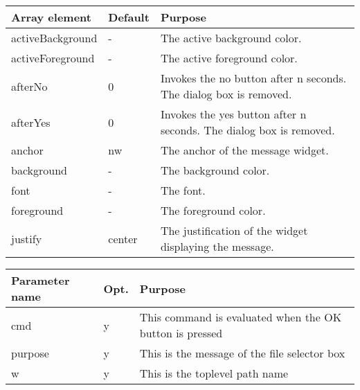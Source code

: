 {\newpage
\clearpage
\samepage \begin{tabular}{|l|l|p{5.5cm}|} \hline
Array element    & Default & Purpose \\  \hline
activeBackground & -       & The active background
                             color.\\  \hline
activeForeground & -       & The active foreground
                             color.\\  \hline
afterNo          & 0       & Invokes the no button after
                             n seconds. The dialog box
                             is removed.\\  \hline
afterYes         & 0       & Invokes the yes button after
                             n seconds. The dialog box
                             is removed.\\  \hline
anchor           & nw      & The anchor of the message
                             widget.\\  \hline
background       & -       & The background color.\\  \hline
font             & -       & The font.\\  \hline
foreground       & -       & The foreground color.\\  \hline
justify          & center  & The justification of the
                             widget displaying the
                             message.\\  \hline
\end{tabular}
}

{\newpage
\clearpage
\samepage \begin{figure}[ht]
  \centerline{
  \epsfysize=4cm
  }

  \label{fig:YesNoBox}
\end{figure}
}

{\newpage
\clearpage
\samepage \begin{tabular}{|l|l|p{6.5cm}|} \hline
Parameter name  & Opt. & Purpose \\  \hline
cmd             & y    & This command is evaluated when
                         the OK button is pressed\\  \hline
purpose         & y    & This is the message of the
                         file selector box\\  \hline
w               & y    & This is the toplevel path
                         name\\  \hline
\end{tabular}
}

